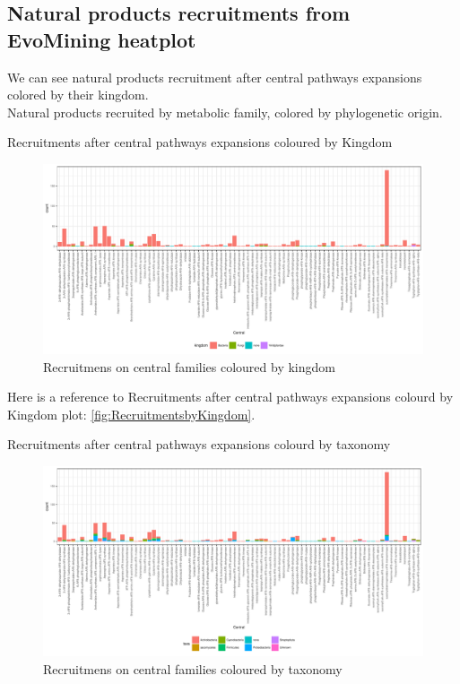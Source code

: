 \documentclass[12pt,twoside]{reedthesis}
\begin{document}
  \subsection{Natural products recruitments from EvoMining
  heatplot}\label{natural-products-recruitments-from-evomining-heatplot-2}
  
  We can see natural products recruitment after central pathways
  expansions colored by their kingdom.\\
  Natural products recruited by metabolic family, colored by phylogenetic
  origin.
  
  Recruitments after central pathways expansions coloured by Kingdom
  
  \begin{figure}[h!tbp]
  \centering
  \includegraphics[angle = 0,scale = 0.6]{chapter5/RecruitmentsbyKingdom.pdf}
  \caption[Recruitmens on central families coloured by kingdom]{\normalsize{Recruitmens on central families coloured by kingdom}}
  \label{fig:RecruitmentsbyKingdom}
  \end{figure}
  
  Here is a reference to Recruitments after central pathways expansions
  colourd by Kingdom plot: \autoref{fig:RecruitmentsbyKingdom}.
  
  \clearpage 
  Recruitments after central pathways expansions colourd by taxonomy
  
  \begin{figure}[h!tbp]
  \centering
  \includegraphics[angle = 0,scale = 0.5]{chapter5/RecruitmentsbyTaxa.pdf}
  \caption[Recruitmens on central families coloured by taxonomy]{\normalsize{Recruitmens on central families coloured by taxonomy}}
  \label{fig:RecruitmentsbyTaxa}
  \end{figure}
  
\end{document}
